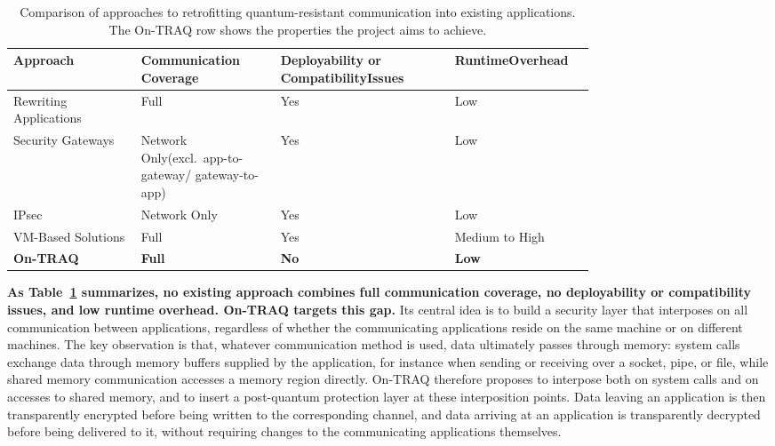 \documentclass[a4paper,10pt,fleqn]{application}
\begin{document}
\begin{table}[htbp]
\centering
\small
\begin{tabular}{|p{0.22\linewidth}|p{0.24\linewidth}|p{0.30\linewidth}|p{}|}
\hline
\textbf{Approach} & \textbf{Communication Coverage} & \textbf{Deployability or Compatibility\newline Issues} & \textbf{Runtime\newline Overhead} \\
\hline
Rewriting Applications & Full & Yes & Low \\
\hline
Security Gateways & \raggedright Network Only\newline (excl.\ app-to-gateway/ gateway-to-app) & Yes & Low \\
\hline
IPsec & Network Only & Yes & Low \\
\hline
VM-Based Solutions & Full & Yes & Medium to High \\
\hline
\textbf{On-TRAQ} & \textbf{Full} & \textbf{No} & \textbf{Low} \\
\hline
\end{tabular}
\caption{Comparison of approaches to retrofitting quantum-resistant communication into existing applications. The On-TRAQ row shows the properties the project aims to achieve.}
\label{tab:comparison}
\end{table}

\medskip

\textbf{As Table~\ref{tab:comparison} summarizes, no existing approach combines full communication coverage, no deployability or compatibility issues, and low runtime overhead. On-TRAQ targets this gap.} Its central idea is to build a security layer that interposes on all communication between applications, regardless of whether the communicating applications reside on the same machine or on different machines. The key observation is that, whatever communication method is used, data ultimately passes through memory: system calls exchange data through memory buffers supplied by the application, for instance when sending or receiving over a socket, pipe, or file, while shared memory communication accesses a memory region directly. On-TRAQ therefore proposes to interpose both on system calls and on accesses to shared memory, and to insert a post-quantum protection layer at these interposition points. Data leaving an application is then transparently encrypted before being written to the corresponding channel, and data arriving at an application is transparently decrypted before being delivered to it, without requiring changes to the communicating applications themselves.
\end{document}

